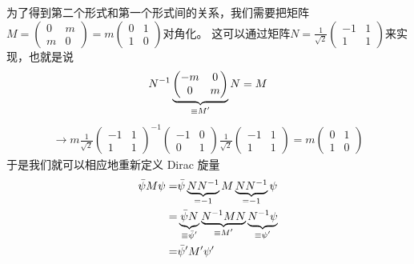 为了得到第二个形式和第一个形式间的关系，我们需要把矩阵$M=\begin{pmatrix}0&m\\m&0\end{pmatrix}=m\begin{pmatrix}0&1\\1&0\end{pmatrix}$对角化。
这可以通过矩阵$N=\frac{1}{\sqrt{2}}\begin{pmatrix}-1&1\\1&1\end{pmatrix}$来实现，也就是说
\begin{align}
  N^{-1}\underbrace{\begin{pmatrix}-m&0\\0&m\end{pmatrix}}_{\mathclap{\equiv M'}}N=M
\end{align}
\begin{align}
  \rightarrow m\frac{1}{\sqrt{2}}\begin{pmatrix}-1&1\\1&1\end{pmatrix}^{-1}\begin{pmatrix}-1&0\\0&1\end{pmatrix}\frac{1}{\sqrt{2}}
  \begin{pmatrix}-1&1\\1&1\end{pmatrix}=m\begin{pmatrix}0&1\\1&0\end{pmatrix}
\end{align}
于是我们就可以相应地重新定义 Dirac 旋量
\begin{align}
\begin{split}
  \bar{\psi}M\psi=&\bar{\psi}\underbrace{NN^{-1}}_{\mathclap{=-1}}M\underbrace{NN^{-1}}_{\mathclap{=-1}}\psi\\
  =&\underbrace{\bar{\psi}N}_{\mathclap{\equiv\bar{\psi}'}}
  \underbrace{N^{-1}MN}_{\mathclap{\equiv M'}}\underbrace{N^{-1}\psi}_{\mathclap{\equiv\psi'}}\\
  =&\bar{\psi}'M'\psi'
  \end{split}
\end{align}

